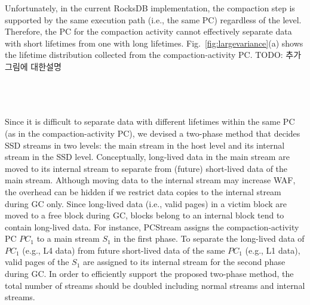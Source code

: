 
Unfortunately, in the current RocksDB implementation, the compaction step is supported 
by the same execution path (i.e., the same PC) regardless of the level.
Therefore, the PC for the compaction activity cannot effectively separate data with 
short lifetimes from one with long lifetimes.
Fig.~\ref{fig:largevariance}(a) shows 
the lifetime distribution collected from the compaction-activity PC.  
{\color{red}TODO: 추가 그림에 대한설명 \\ \\ \\ \\ }

Since it is difficult to separate data with different lifetimes within the same PC 
(as in the compaction-activity PC), we devised a two-phase method that decides SSD 
streams in two levels: the main stream in the host level and 
its internal stream in the SSD level.
Conceptually, long-lived data in the main stream are moved to its internal stream to 
separate from (future) short-lived data of the main stream.
Although moving data to the internal stream may increase WAF,
the overhead can be hidden if we restrict data copies to the internal stream during GC only.
Since long-lived data (i.e., valid pages) in a victim block are moved to a free block during GC, 
blocks belong to an internal block tend to contain long-lived data.
For instance, \textsf{\small PCStream} assigns the compaction-activity PC {\it $PC_1$} to a
main stream {\it $S_1$} in the first phase.
To separate the long-lived data of {\it $PC_1$} (e.g., L4 data) 
from future short-lived data of the same {\it $PC_1$} (e.g., L1 data), 
valid pages of the {\it $S_1$} are assigned to its internal stream for the second phase during GC.
{\color{blue}
In order to efficiently support the proposed two-phase method, the total number of streams 
should be doubled including normal streams and internal streams.
}


